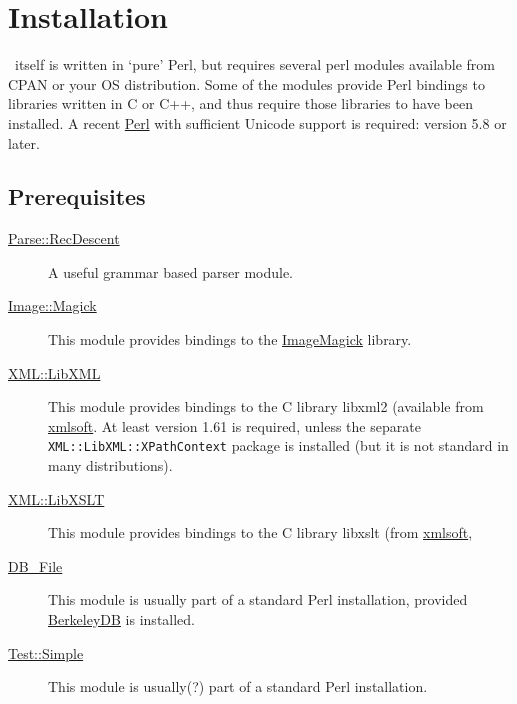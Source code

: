 \documentclass{article}
\begin{document}
\section{Installation}\label{install}

\LaTeXML\ itself is written in `pure' Perl, but requires several
perl modules available from CPAN or your OS distribution.
Some of the modules provide Perl bindings to libraries
written in C or C++, and thus require those libraries to have been installed.
A recent \href{http://www.perl.org/}{Perl}
with sufficient Unicode support is required: version 5.8 or later.

\subsection{Prerequisites}

\begin{description}
\item[\href{http://search.cpan.org/search?query=Parse::RecDescent&mode=module}{Parse::RecDescent}]
    A useful grammar based parser module.
\item[\href{http://search.cpan.org/search?query=Image::Magick&mode=module}{Image::Magick}]
    This module provides bindings to the \href{http://www.imagemagick.org/}{ImageMagick} library.
\item[\href{http://search.cpan.org/search?query=XML::LibXML&mode=module}{XML::LibXML}]
    This module provides bindings to the C library libxml2
    (available from \href{http://www.xmlsoft.org}{xmlsoft}.
    At least version 1.61 is required, unless the separate \texttt{XML::LibXML::XPathContext}
    package is installed (but it is not standard in many distributions).
\item[\href{http://search.cpan.org/search?query=XML::LibXSLT&mode=module}{XML::LibXSLT}]
    This module provides bindings to the C library libxslt
    (from \href{http://www.xmlsoft.org}{xmlsoft},
\item[\href{http://search.cpan.org/search?query=DB_File&mode=module}{DB\_File}]
    This module is usually part of a standard Perl installation, provided
    \href{http://www.sleepycat.com}{BerkeleyDB} is installed.
\item[\href{http://search.cpan.org/search?query=Test::Simple&mode=module}{Test::Simple}]
    This module is usually(?) part of a standard Perl installation.
\end{description}
\end{document}

